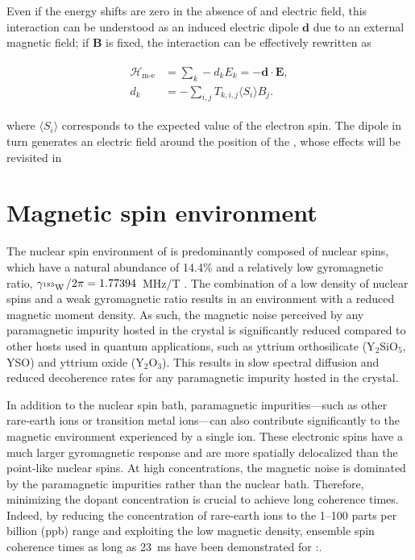 Even if the energy shifts are zero in the absence of and electric field, this interaction can be understood as an induced electric dipole $\mathbf{d}$ due to an external magnetic field; if $\mathbf{B}$ is fixed, the interaction can be effectively rewritten as 

\begin{align}
\begin{split}
    \mathcal{H}_{\text{m-e}} &= \sum_k-d_k E_k = -\mathbf{d} \cdot \mathbf{E}, \\
    d_k &= - \sum_{i,j} T_{k, i, j} \langle S_{i}\rangle B_j.
\end{split}
\label{seq:electric_dipole}
\end{align}

where $\langle S_i \rangle$ corresponds to the expected value of the electron spin. The dipole in turn generates an electric field around the position of the \Er, whose effects will be revisited in 

\section{Magnetic spin environment}

The nuclear spin environment of \Ca is predominantly composed of \W nuclear spins, which have a natural abundance of 14.4\% and a relatively low gyromagnetic ratio, $\gamma_{\text{$^{183}$W\,}}/2\pi = 1.77394$~MHz/T . The combination of a low density of nuclear spins and a weak gyromagnetic ratio results in an environment with a reduced magnetic moment density.
As such, the magnetic noise perceived by any paramagnetic impurity hosted in the crystal is significantly reduced compared to other hosts used in quantum applications, such as yttrium orthosilicate (Y$_2$SiO$_5$, YSO) and yttrium oxide (Y$_2$O$_3$). This results in slow spectral diffusion and reduced decoherence rates for any paramagnetic impurity hosted in the crystal.

In addition to the nuclear spin bath, paramagnetic impurities—such as other rare-earth ions or transition metal ions—can also contribute significantly to the magnetic environment experienced by a single \Er ion. These electronic spins have a much larger gyromagnetic response and are more spatially delocalized than the point-like nuclear spins. At high concentrations, the magnetic noise is dominated by the paramagnetic impurities rather than the nuclear bath. Therefore, minimizing the dopant concentration is crucial to achieve long coherence times. Indeed, by reducing the concentration of rare-earth ions to the 1--100 parts per billion (ppb) range and exploiting the low magnetic density, ensemble spin coherence times as long as 23~ms have been demonstrated for \Er:\Ca {}.

